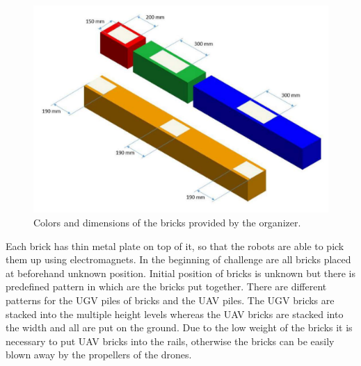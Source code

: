 \begin{figure}[H]

\centering
\includegraphics[scale=0.35]{fig/brick_sample.png}
\caption[Bricks definition]{Colors and dimensions of the bricks provided by the organizer.}
\label{fig:brickdef}

\end{figure}

Each brick has thin metal plate on top of it, so that the robots are able to pick them up using electromagnets. In the beginning of challenge are all bricks placed at beforehand unknown position. Initial position of bricks is unknown but there is predefined pattern in which are the bricks put together. There are different patterns for the UGV piles of bricks and the UAV piles. The UGV bricks are stacked into the multiple height levels whereas the UAV bricks are stacked into the width and all are put on the ground. Due to the low weight of the bricks it is necessary to put UAV bricks into the rails, otherwise the bricks can be easily blown away by the propellers of the drones.
